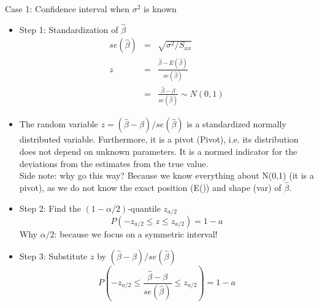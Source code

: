 \documentclass{article}
\begin{document}
Case 1: Confidence interval when $\sigma ^{2}$ is known
\begin{itemize}
	\item Step 1: Standardization of $\hat{\beta}$%
	\begin{eqnarray*}
		se(\hat{\beta}) &=&\sqrt{\sigma ^{2}/S_{xx}} \\
		z &=&\frac{\hat{\beta}-E(\hat{\beta})}{se(\hat{\beta})} \\
		&=&\frac{\hat{\beta}-\beta }{se(\hat{\beta})}\sim N\left( 0,1\right)
	\end{eqnarray*}
	
	\item The random variable $z=(\hat{\beta}-\beta )/se(\hat{\beta})$ is a standardized normally distributed variable. Furthermore, it is a
	pivot (Pivot), i.e. its distribution does not depend on unknown parameters. It is a normed indicator for the deviations from the estimates from the true value.\\
	Side note: why go this way? Because we know everything about N(0,1) (it is a pivot), as we do not know the exact position (E()) and shape (var) of $\hat{\beta}$. 
	
	\item Step 2: Find the $\left( 1-\alpha /2\right) $-quantile $z_{a/2}$%
	\begin{equation*}
	P(-z_{a/2}\leq z\leq z_{a/2})=1-a
	\end{equation*}	
	Why $\alpha /2$: because we focus on a symmetric interval!
	\item Step 3: Substitute $z$ by $(\hat{\beta}-\beta )/se(\hat{\beta})$%
	\begin{equation*}
	P\left( -z_{a/2}\leq \frac{\hat{\beta}-\beta }{se(\hat{\beta})}\leq
	z_{a/2}\right) =1-a
	\end{equation*}
	

\end{itemize}
\end{document}
